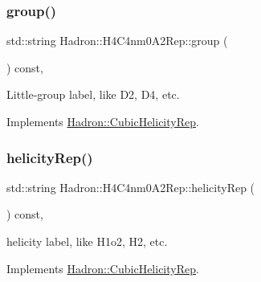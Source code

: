 \mbox{\label{structHadron_1_1H4C4nm0A2Rep_a9424437b4e8f2230697222a77fe7b3e0}} 
\subsubsection{\texorpdfstring{group()}{group()}\hspace{0.1cm}{\footnotesize\ttfamily [5/5]}}
{\footnotesize\ttfamily std\+::string Hadron\+::\+H4\+C4nm0\+A2\+Rep\+::group (\begin{DoxyParamCaption}{ }\end{DoxyParamCaption}) const\hspace{0.3cm}{\ttfamily [inline]}, {\ttfamily [virtual]}}

Little-\/group label, like D2, D4, etc. 

Implements \mbox{\hyperlink{structHadron_1_1CubicHelicityRep_a101a7d76cd8ccdad0f272db44b766113}{Hadron\+::\+Cubic\+Helicity\+Rep}}.

\mbox{\label{structHadron_1_1H4C4nm0A2Rep_ac6d9fd3861fba10b770f3d953e748006}} 
\subsubsection{\texorpdfstring{helicityRep()}{helicityRep()}\hspace{0.1cm}{\footnotesize\ttfamily [1/3]}}
{\footnotesize\ttfamily std\+::string Hadron\+::\+H4\+C4nm0\+A2\+Rep\+::helicity\+Rep (\begin{DoxyParamCaption}{ }\end{DoxyParamCaption}) const\hspace{0.3cm}{\ttfamily [inline]}, {\ttfamily [virtual]}}

helicity label, like H1o2, H2, etc. 

Implements \mbox{\hyperlink{structHadron_1_1CubicHelicityRep_af1096946b7470edf0a55451cc662f231}{Hadron\+::\+Cubic\+Helicity\+Rep}}.

\mbox{\label{structHadron_1_1H4C4nm0A2Rep_ac6d9fd3861fba10b770f3d953e748006}} 
